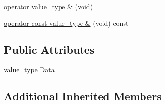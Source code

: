 {\bf }\par
\begin{DoxyCompactItemize}
\item 
\hyperlink{classmts_generic_object_proxy_aef0697bd0bbbed1452a36e9fc9809905}{operator value\-\_\-type \&} (void)
\item 
\hyperlink{classmts_generic_object_proxy_aab317b5dc0c85123eaf55d3e4237bab5}{operator const value\-\_\-type \&} (void) const 
\end{DoxyCompactItemize}

\subsection*{Public Attributes}
\begin{DoxyCompactItemize}
\item 
\hyperlink{classmts_generic_object_proxy_a4c47d4b184e02d7443de1face033af34}{value\-\_\-type} \hyperlink{classmts_generic_object_proxy_a577e49255c24db1f0573c99de275b339}{Data}
\end{DoxyCompactItemize}
\subsection*{Additional Inherited Members}


